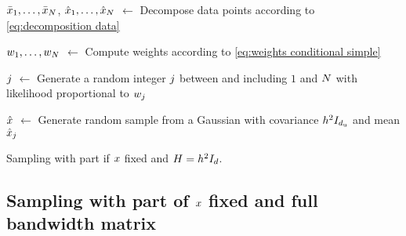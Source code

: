 \begin{algorithm}[t]
	
	$\bar{x}_{1},\ldots,\bar{x}_{N}$, $\hat{x}_{1},\ldots,\hat{x}_{N}$ $\gets$ Decompose data points according to \cref{eq:decomposition data}
	
	$w_{1},\ldots,w_{N}$ $\gets$ Compute weights according to \cref{eq:weights conditional simple}
	
	$j$ $\gets$ Generate a random integer $j$ between and including $1$ and $N$ with likelihood proportional to $w_{j}$
	
	$\hat{x}$ $\gets$ Generate random sample from a Gaussian with covariance $h^2 I_{d_\mathrm{u}}$ and mean $\hat{x}_{j}$
		
	\caption{Sampling with part if $x$ fixed and $H=h^2 I_{d}$.}
	\label{alg:conditional simple}
\end{algorithm}



\subsection{Sampling with part of $x$ fixed and full bandwidth matrix}
\label{sec:sampling conditional hard}

